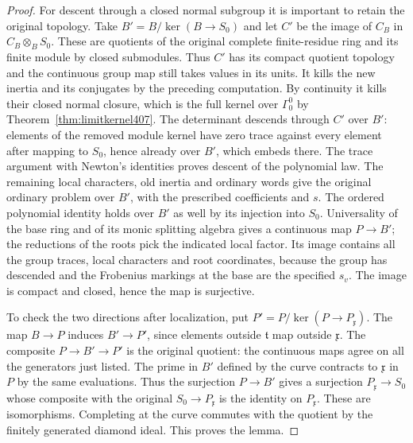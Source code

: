 \documentclass[a4paper,11pt]{article}
\theoremstyle{definition}
\theoremstyle{remark}
\numberwithin{equation}{section}
\begin{document}
\begin{proof}
For descent through a closed normal subgroup it is important
to retain the original topology. Take
\(B'=B/\ker(B\to S_0)\) and let \(C'\) be the image of
\(C_B\) in \(C_B\otimes_B S_0\). These are quotients of
the original complete finite-residue ring and its finite
module by closed submodules. Thus \(C'\) has its compact
quotient topology and the continuous group map still
takes values in its units. It kills the new inertia and
its conjugates by the preceding computation. By continuity
it kills their closed normal closure, which is the full
kernel over \(\Gamma_0^0\) by
Theorem~\ref{thm:limitkernel407}. The determinant descends
through \(C'\) over \(B'\): elements of the removed module
kernel have zero trace against every element after mapping
to \(S_0\), hence already over \(B'\), which embeds there.
The trace argument with Newton's identities proves descent
of the polynomial law. The remaining local characters,
old inertia and ordinary words give the original ordinary
problem over \(B'\), with the prescribed coefficients and
\(s\). The ordered polynomial identity holds over \(B'\)
as well by its injection into \(S_0\). Universality of the
base ring and of its monic splitting algebra gives a
continuous map \(P\to B'\); the reductions of the roots
pick the indicated local factor. Its image contains all
the group traces, local characters and root coordinates,
because the group has descended and the Frobenius
markings at the base are the specified \(s_v\). The image
is compact and closed, hence the map is surjective.

To check the two directions after localization, put
\(P'=P/\ker(P\to P_{\mathfrak x})\). The map \(B\to P\)
induces \(B'\to P'\), since elements outside \(\mathfrak t\)
map outside \(\mathfrak x\). The composite \(P\to B'\to P'\)
is the original quotient: the continuous maps agree on all
the generators just listed. The prime in \(B'\) defined by
the curve contracts to \(\mathfrak x\) in \(P\) by the
same evaluations. Thus the surjection \(P\to B'\) gives
a surjection \(P_{\mathfrak x}\to S_0\) whose composite
with the original \(S_0\to P_{\mathfrak x}\) is the
identity on \(P_{\mathfrak x}\). These are isomorphisms.
Completing at the curve commutes with the quotient by
the finitely generated diamond ideal. This proves the lemma.
\end{proof}
\end{document}
